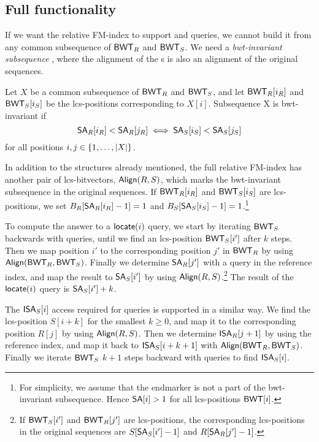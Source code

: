 \subsection{Full functionality}

If we want the relative FM-index to support \locate{} and \extract{} queries,
we cannot build it from any common subsequence of $\mathsf{BWT}_{R}$ and $\mathsf{BWT}_{S}$.
We need a \emph{bwt-invariant subsequence} \cite{Belazzougui2014}, where the
alignment of the \BWT{}s is also an alignment of the original sequences.

\begin{definition}\label{def:bwt-invariant}
Let $X$ be a common subsequence of $\mathsf{BWT}_{R}$ and $\mathsf{BWT}_{S}$, and let
$\mathsf{BWT}_{R}[i_{R}]$ and $\mathsf{BWT}_{S}[i_{S}]$ be the lcs-positions corresponding to
$X[i]$. Subsequence X is bwt-invariant if
$$
\mathsf{SA}_{R}[i_{R}] < \mathsf{SA}_{R}[j_{R}] \iff \mathsf{SA}_{S}[i_{S}] < \mathsf{SA}_{S}[j_{S}]
$$
for all positions $i, j \in \{ 1, \dotsc, \lvert X \rvert \}$.
\end{definition}

In addition to the structures already mentioned, the full relative FM-index
has another pair of lcs-bitvectors, $\mathsf{Align}(R,S)$, which marks the
bwt-invariant subsequence in the original sequences. If $\mathsf{BWT}_{R}[i_{R}]$ and
$\mathsf{BWT}_{S}[i_{S}]$ are lcs-positions, we set $B_{R}[\mathsf{SA}_{R}[i_{R}]-1] = 1$ and
$B_{S}[\mathsf{SA}_{S}[i_{S}]-1] = 1$.\footnote{For simplicity, we assume that the
endmarker is not a part of the bwt-invariant subsequence. Hence $\mathsf{SA}[i] > 1$
for all lcs-positions $\mathsf{BWT}[i]$.}

To compute the answer to a $\mathsf{locate}(i)$ query, we start by iterating
$\mathsf{BWT}_{S}$ backwards with \LF{} queries, until we find an lcs-position
$\mathsf{BWT}_{S}[i']$ after $k$ steps. Then we map position $i'$ to the corresponding
position $j'$ in $\mathsf{BWT}_{R}$ by using $\mathsf{Align}(\mathsf{BWT}_{R},\mathsf{BWT}_{S})$. Finally we
determine $\mathsf{SA}_{R}[j']$ with a \locate{} query in the reference index, and map
the result to $\mathsf{SA}_{S}[i']$ by using $\mathsf{Align}(R,S)$.\footnote{If $\mathsf{BWT}_{S}[i']$
and $\mathsf{BWT}_{R}[j']$ are lcs-positions, the corresponding lcs-positions in the
original sequences are $S[\mathsf{SA}_{S}[i']-1]$ and $R[\mathsf{SA}_{R}[j']-1]$.} The result
of the $\mathsf{locate}(i)$ query is $\mathsf{SA}_{S}[i']+k$.

The $\mathsf{ISA}_{S}[i]$ access required for \extract{} queries is supported in a
similar way. We find the lcs-position $S[i+k]$ for the smallest $k \ge 0$, and
map it to the corresponding position $R[j]$ by using $\mathsf{Align}(R,S)$. Then we
determine $\mathsf{ISA}_{R}[j+1]$ by using the reference index, and map it back to
$\mathsf{ISA}_{S}[i+k+1]$ with $\mathsf{Align}(\mathsf{BWT}_{R},\mathsf{BWT}_{S})$. Finally we iterate
$\mathsf{BWT}_{S}$ $k+1$ steps backward with \LF{} queries to find $\mathsf{ISA}_{S}[i]$.

